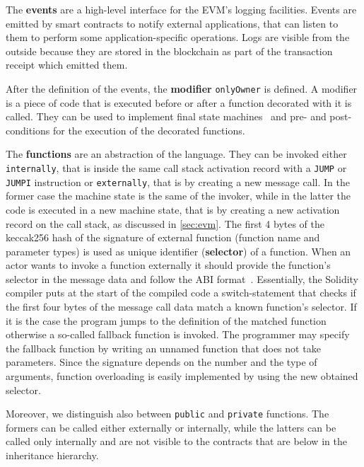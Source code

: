 The \textbf{events} are a high-level interface for the EVM's logging
facilities. Events are emitted by smart contracts to notify external
applications, that can listen to them to perform some application-specific
operations. Logs are visible from the outside because they are stored
in the blockchain as part of the transaction receipt which emitted them.

After the definition of the events, the \textbf{modifier} \verb|onlyOwner| is
defined. A modifier is a piece of code that is executed before or after a
function decorated with it is called. They can be used to implement final
state machines~\cite{bib:solidity-docs} and pre- and post-conditions for the
execution of the decorated functions.

The \textbf{functions} are an abstraction of the language. They can be invoked
either \texttt{internally}, that is inside the same call stack activation record
with a \texttt{JUMP} or \texttt{JUMPI} instruction or \texttt{externally}, that
is by creating a new message call. In the former case the machine state is the
same of the invoker, while in the latter the code is executed in a new machine
state, that is by creating a new activation record on the call stack, as
discussed in \autoref{sec:evm}. The first 4 bytes of the keccak256 hash of the
signature of external function (function name and parameter types) is used as
unique identifier (\textbf{selector}) of a function. When an actor wants to
invoke a function externally it should provide the function's selector in the
message data and follow the ABI format~\cite{bib:solidity-docs}. Essentially,
the Solidity compiler puts at the start of the compiled code a switch-statement
that checks if the first four bytes of the message call data match a known
function's selector. If it is the case the program jumps to the definition of
the matched function otherwise a so-called fallback function is invoked. The
programmer may specify the fallback function by writing an unnamed function
that does not take parameters. Since the signature depends on the number and
the type of arguments, function overloading is easily implemented by using the
new obtained selector.

Moreover, we distinguish also between \texttt{public} and \texttt{private}
functions. The formers can be called either externally or internally, while the
latters can be called only internally and are not visible to the contracts that
are below in the inheritance hierarchy.

